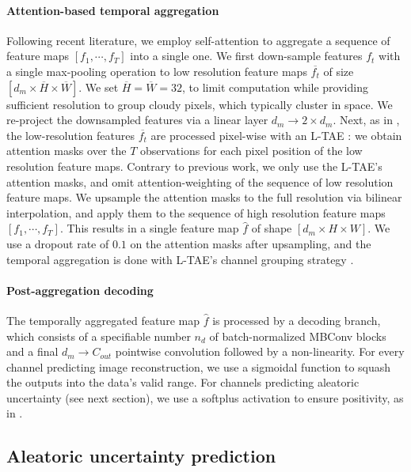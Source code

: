 \documentclass[10pt,twocolumn,letterpaper]{article}
\begin{document}
\paragraph{\bf Attention-based temporal aggregation } Following recent literature, we employ self-attention to aggregate a sequence of feature maps $[f_1, \cdots, f_T]$ into a single one. We first down-sample features $f_t$ with a single max-pooling operation to low resolution feature maps $\overline{f_t}$ of size $\left[d_m \times \overline{H} \times \overline{W} \right]$. We set $\overline{H} = \overline{W} = 32$, to limit computation while providing sufficient resolution to group cloudy pixels, which typically cluster in space.  We re-project the downsampled features via a linear layer $d_m \rightarrow 2 \times d_m $.
Next, as in \cite{garnot2021panoptic}, the low-resolution features $\overline{f_t}$ are processed pixel-wise with an L-TAE \cite{garnot2020lightweight,garnot2020satellite}: we obtain attention masks over the $T$ observations  for each pixel position of the low resolution feature maps. Contrary to previous work, we only use the L-TAE's  attention masks, and omit attention-weighting of the sequence of low resolution feature maps. We upsample the attention masks to the full resolution via bilinear interpolation, and apply them to the sequence of high resolution feature maps $[f_1, \cdots, f_T]$. This results in a single feature map $\hat{f}$ of shape $\left[d_m \times H \times W \right]$.
We use a dropout rate of $0.1$ on the attention masks after upsampling, and the temporal aggregation is done with L-TAE's channel grouping strategy \cite{garnot2020lightweight}. 

\paragraph{\bf Post-aggregation decoding} The temporally aggregated feature map $\hat{f}$ is processed by a decoding branch, which consists of a specifiable number $n_d$ of batch-normalized MBConv blocks and a final $d_m \rightarrow C_{out}$ pointwise convolution followed by a non-linearity. 
For every channel predicting image reconstruction, we use a sigmoidal function to  squash the outputs into the data's valid range.
For channels predicting aleatoric uncertainty (see next section), we use a softplus activation to ensure positivity, as in \cite{seitzer2021pitfalls, harakeh2022estimating, stirn2022faithful}.


\subsection{Aleatoric uncertainty prediction}
\label{sub:optimization}
\end{document}

